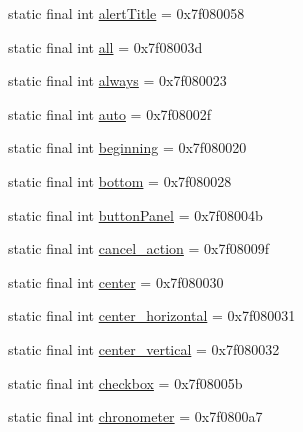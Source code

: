 \begin{CompactItemize}
\item 
static final int \hyperlink{classandroid_1_1support_1_1graphics_1_1drawable_1_1animated_1_1_r_1_1id_c6e56ec9f15a2d2c8be141268257b360}{alertTitle} = 0x7f080058
\item 
static final int \hyperlink{classandroid_1_1support_1_1graphics_1_1drawable_1_1animated_1_1_r_1_1id_8af33bb70075d45cad5c724aa78a1f68}{all} = 0x7f08003d
\item 
static final int \hyperlink{classandroid_1_1support_1_1graphics_1_1drawable_1_1animated_1_1_r_1_1id_b800a7140f41e98f380bd20596fbf13c}{always} = 0x7f080023
\item 
static final int \hyperlink{classandroid_1_1support_1_1graphics_1_1drawable_1_1animated_1_1_r_1_1id_8abaf657e173c4ac7d373a2763b46150}{auto} = 0x7f08002f
\item 
static final int \hyperlink{classandroid_1_1support_1_1graphics_1_1drawable_1_1animated_1_1_r_1_1id_3931da752d99f98458424af36e9eb43e}{beginning} = 0x7f080020
\item 
static final int \hyperlink{classandroid_1_1support_1_1graphics_1_1drawable_1_1animated_1_1_r_1_1id_8ebc4bb13ee88d58f2524d4f3fb5be25}{bottom} = 0x7f080028
\item 
static final int \hyperlink{classandroid_1_1support_1_1graphics_1_1drawable_1_1animated_1_1_r_1_1id_69447abdc604819cb8e194225b2221b9}{buttonPanel} = 0x7f08004b
\item 
static final int \hyperlink{classandroid_1_1support_1_1graphics_1_1drawable_1_1animated_1_1_r_1_1id_28ff9236a4e1801d9eeae0c97b717102}{cancel\_\-action} = 0x7f08009f
\item 
static final int \hyperlink{classandroid_1_1support_1_1graphics_1_1drawable_1_1animated_1_1_r_1_1id_c19668e09c264e8b5fdf80f9f5666b02}{center} = 0x7f080030
\item 
static final int \hyperlink{classandroid_1_1support_1_1graphics_1_1drawable_1_1animated_1_1_r_1_1id_e1d54045ba0c5951feb7fd6877bd6efd}{center\_\-horizontal} = 0x7f080031
\item 
static final int \hyperlink{classandroid_1_1support_1_1graphics_1_1drawable_1_1animated_1_1_r_1_1id_be1f8f4569de4411fe0af0460a214dde}{center\_\-vertical} = 0x7f080032
\item 
static final int \hyperlink{classandroid_1_1support_1_1graphics_1_1drawable_1_1animated_1_1_r_1_1id_e2bb8cf741ac825b98d077243f0f576e}{checkbox} = 0x7f08005b
\item 
static final int \hyperlink{classandroid_1_1support_1_1graphics_1_1drawable_1_1animated_1_1_r_1_1id_6754de4917dd63aeb69905c3c0b603bb}{chronometer} = 0x7f0800a7

\end{CompactItemize}
